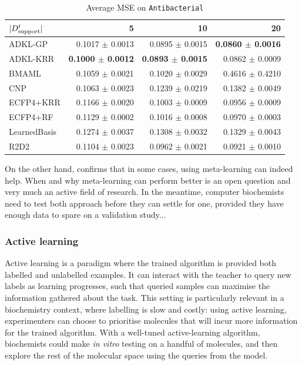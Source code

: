 \documentclass[11pt]{article}
\numberwithin{equation}{subsection}
\begin{document}
\begin{table}[ht]
  \centering
  \begin{tabular}{@{}lrrr@{}}
    \toprule
    $|{D_{\mathrm{support}}^t}|$ &               5  &               10 &               20 \\
    \midrule
    ADKL-GP      &  0.1017 $\pm$ 0.0013 &  0.0895 $\pm$ 0.0015 &  \textbf{0.0860 $\pm$ 0.0016} \\
    ADKL-KRR     &  \textbf{0.1000 $\pm$ 0.0012} &  \textbf{0.0893 $\pm$ 0.0015} &  0.0862 $\pm$ 0.0009 \\
    BMAML        &  0.1059 $\pm$ 0.0021 &  0.1020 $\pm$ 0.0029 &  0.4616 $\pm$ 0.4210 \\
    CNP          &  0.1063 $\pm$ 0.0023 &  0.1239 $\pm$ 0.0219 &  0.1382 $\pm$ 0.0049 \\
    ECFP4+KRR    &  0.1166 $\pm$ 0.0020 &  0.1003 $\pm$ 0.0009 &  0.0956 $\pm$ 0.0009 \\
    ECFP4+RF     &  0.1129 $\pm$ 0.0002 &  0.1016 $\pm$ 0.0008 &  0.0970 $\pm$ 0.0003 \\
    LearnedBasis &  0.1274 $\pm$ 0.0037 &  0.1308 $\pm$ 0.0032 &  0.1329 $\pm$ 0.0043 \\
    R2D2         &  0.1104 $\pm$ 0.0023 &  0.0962 $\pm$ 0.0021 &  0.0921 $\pm$ 0.0010 \\
    \bottomrule
  \end{tabular}
  \caption{Average MSE on \texttt{Antibacterial}}
  \label{tab:results-antibacterial}
\end{table}

On the other hand,  confirms that in some cases, using meta-learning can indeed help. When and why meta-learning can perform better is an open question and very much an active field of research. In the meantime, computer biochemists need to test both approach before they can settle for one, provided they have enough data to spare on a validation study...



\subsubsection{Active learning}

Active learning is a paradigm where the trained algorithm is provided both labelled and unlabelled examples. It can interact with the teacher to query new labels as learning progresses, such that queried samples can maximise the information gathered about the task.
This setting is particularly relevant in a biochemistry context, where labelling is slow and costly: using active learning, experimenters can choose to prioritise molecules that will incur more information for the trained algorithm. With a well-tuned active-learning algorithm, biochemists could make \textit{in vitro} testing on a handful of molecules, and then explore the rest of the molecular space using the queries from the model.
\end{document}
